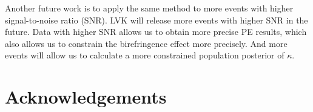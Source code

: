 \documentclass[reprint,amsmath,amssymb,aps,twocolumn]{aastex631}
\begin{document}
Another future work is to apply the same method to more events with higher signal-to-noise ratio (SNR).
LVK will release more events with higher SNR in the future.
Data with higher SNR allows us to obtain more precise PE results, which also allows us to constrain the birefringence effect more precisely.
And more events will allow us to calculate a more constrained population posterior of $\kappa$.

\section{Acknowledgements}
\label{sec:Acknowledgements}



\end{document}
